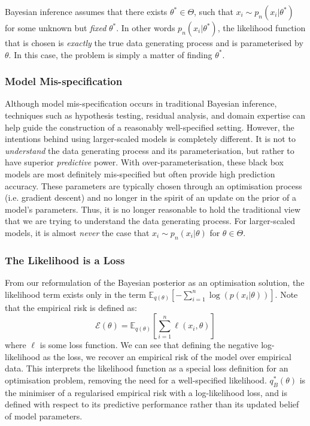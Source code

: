 \documentclass[twoside,11pt]{article}
\begin{document}
Bayesian inference assumes that there exists $\theta^* \in \Theta$, such that $x_i \sim p_n(x_i | \theta^*)$ for some unknown but \textit{
fixed} $\theta^*$. In other words $p_n(x_i | \theta^*)$, the likelihood function that is chosen is \textit{exactly} the true data generating process and is parameterised by $\theta$. In this case, the problem is simply a matter of finding $\theta^*$. 
\subsubsection{Model Mis-specification}
Although model mis-specification occurs in traditional Bayesian inference, techniques such as hypothesis testing, residual analysis, and domain expertise can help guide the construction of a reasonably well-specified setting. However, the intentions behind using larger-scaled models is completely different. It is not to \textit{understand} the data generating process and its parameterisation, but rather to have superior \textit{predictive} power. With over-parameterisation, these black box models are most definitely mis-specified but often provide high prediction accuracy. These parameters are typically chosen through an optimisation process (i.e. gradient descent) and no longer in the spirit of an update on the prior of a model's parameters. Thus, it is no longer reasonable to hold the traditional view that we are trying to understand the data generating process. For larger-scaled models, it is almost \textit{never} the case that $x_i \sim p_n(x_i|\theta)$ for  $\theta \in \Theta$.
\subsubsection{The Likelihood is a Loss}
From our reformulation of the Bayesian posterior as an optimisation solution, the likelihood term exists only in the term $\mathbb{E}_{q(\theta)}\left[-\sum_{i=1}^n \log\left(p(x_i|\theta)\right)\right]$. Note that the empirical risk is defined as:
\[\mathcal{E}(\theta) = \mathbb{E}_{q(\theta)}\left[\sum_{i=1}^n \ell\left(x_i, \theta\right)\right]\]
where $\ell$ is some loss function. We can see that defining the negative log-likelihood as the loss, we recover an empirical risk of the model over empirical data. This interprets the likelihood function as a special loss definition for an optimisation problem,  removing the need for a well-specified likelihood. $q_B^*(\theta)$ is the minimiser of a regularised empirical risk with a log-likelihood loss, and is defined with respect to its predictive performance rather than its updated belief of model parameters.
\end{document}

